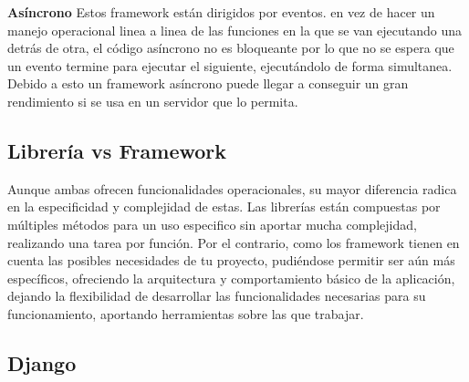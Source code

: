 \textbf{Asíncrono}
\newline
Estos framework están dirigidos por eventos. en vez de hacer un manejo operacional linea a linea de las funciones en la que se van ejecutando una detrás de otra, el código asíncrono no es bloqueante por lo que no se espera que un evento termine para ejecutar el siguiente, ejecutándolo de forma simultanea. Debido a esto un framework asíncrono puede llegar a conseguir un gran rendimiento si se usa en un servidor que lo permita.

\newpage

\subsection{Librería vs Framework}
Aunque ambas ofrecen funcionalidades operacionales, su mayor diferencia radica en la especificidad y complejidad de estas.
\newline
\newline
Las librerías están compuestas por múltiples métodos para un uso especifico sin aportar mucha complejidad, realizando una tarea por función.
\newline
\newline
Por el contrario, como los framework tienen en cuenta las posibles necesidades de tu proyecto, pudiéndose permitir ser aún más específicos, ofreciendo la arquitectura y comportamiento básico de la aplicación, dejando la flexibilidad de desarrollar las funcionalidades necesarias para su funcionamiento, aportando herramientas sobre las que trabajar. \cite{glez2014web}

\subsection{Django}

